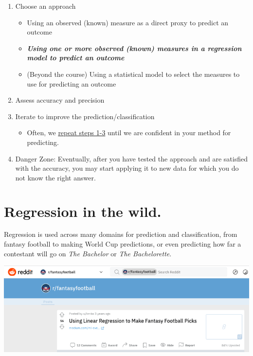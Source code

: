 \documentclass[
  letterpaper,
  DIV=11,
  numbers=noendperiod]{scrreprt}
\providecommand{\tightlist}{%
  \setlength{\itemsep}{0pt}\setlength{\parskip}{0pt}}\usepackage{longtable,booktabs,array}
\begin{document}
\begin{enumerate}
\def\labelenumi{\arabic{enumi}.}
\tightlist
\item
  Choose an approach

  \begin{itemize}
  \tightlist
  \item
    Using an observed (known) measure as a direct proxy to predict an
    outcome
  \item
    \textbf{\emph{Using one or more observed (known) measures in a
    regression model to predict an outcome}}
  \item
    (Beyond the course) Using a statistical model to select the measures
    to use for predicting an outcome
  \end{itemize}
\item
  Assess accuracy and precision
\item
  Iterate to improve the prediction/classification

  \begin{itemize}
  \tightlist
  \item
    Often, we \href{https://www.youtube.com/watch?v=rXPfovXw2tw}{repeat
    steps 1-3} until we are confident in your method for predicting.
  \end{itemize}
\item
  Danger Zone: Eventually, after you have tested the approach and are
  satisfied with the accuracy, you may start applying it to new data for
  which you do not know the right answer.
\end{enumerate}

\hypertarget{regression-in-the-wild.}{%
\section{Regression in the wild.}\label{regression-in-the-wild.}}

Regression is used across many domains for prediction and
classification, from fantasy football to making World Cup predictions,
or even predicting how far a contestant will go on \emph{The Bachelor}
or \emph{The Bachelorette}.

\includegraphics{images/fantasy1.png}
\end{document}
